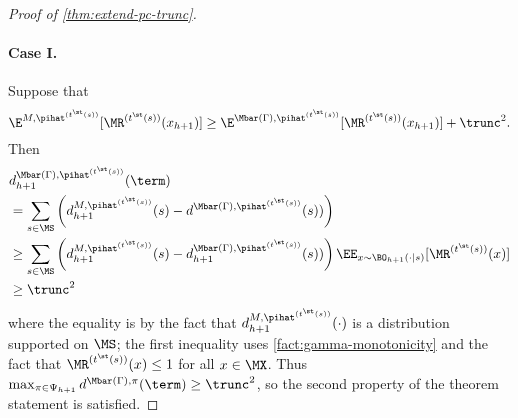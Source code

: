 \begin{proof}[Proof of \cref{thm:extend-pc-trunc}]
\paragraph{Case I.} Suppose that 
\[\E^{M,\pihat^{(t^\st(s))}}[\MR^{(t^\st(s))}(x_{h+1})] \geq \E^{\Mbar(\Gamma),\pihat^{(t^\st(s))}}[\MR^{(t^\st(s))}(x_{h+1})] + \trunc^2.\]
Then
\begin{align*}
&d^{\Mbar(\Gamma),\pihat^{(t^\st(s))}}_{h+1}(\term) \\ 
&= \sum_{s \in \MS} \left(d^{M,\pihat^{(t^\st(s))}}_{h+1}(s) - d^{\Mbar(\Gamma),\pihat^{(t^\st(s))}}(s))\right) \\ 
&\geq \sum_{s \in \MS} \left(d^{M,\pihat^{(t^\st(s))}}_{h+1}(s) - d^{\Mbar(\Gamma),\pihat^{(t^\st(s))}}_{h+1}(s))\right) \EE_{x\sim\BO_{h+1}(\cdot|s)}[\MR^{(t^\st(s))}(x)] \\ 
&\geq \trunc^2 
\end{align*}
where the equality is by the fact that $d^{M,\pihat^{(t^\st(s))}}_{h+1}(\cdot)$ is a distribution supported on $\MS$; the first inequality uses \cref{fact:gamma-monotonicity} and the fact that $\MR^{(t^\st(s))}(x) \leq 1$ for all $x \in \MX$. Thus $\max_{\pi\in\Psi_{h+1}} d^{\Mbar(\Gamma),\pi}(\term) \geq \trunc^2$, so the second property of the theorem statement is satisfied. 


\end{proof}
